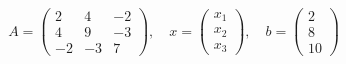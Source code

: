 \documentclass[preview]{standalone}
\begin{document}
\begin{align*}
A = \begin{pmatrix}
            2 & 4 & -2 \\
            4 & 9 & -3 \\
            -2 & -3 & 7
            \end{pmatrix}, \quad
            x = \begin{pmatrix}
            x_1 \\ x_2 \\ x_3
            \end{pmatrix}, \quad
            b = \begin{pmatrix}
            2 \\ 8 \\ 10
            \end{pmatrix}
\end{align*}
\end{document}
